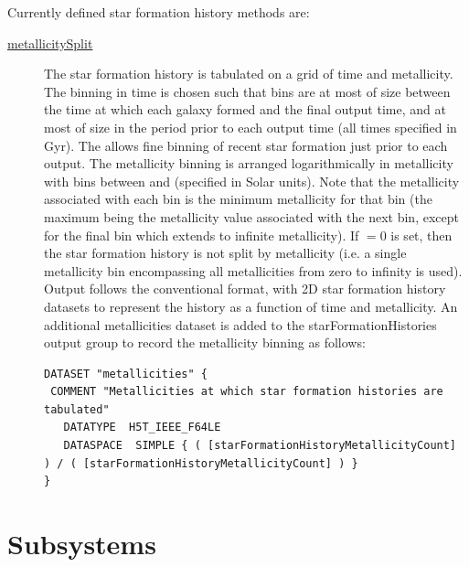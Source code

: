 Currently defined star formation history methods are:
\begin{description}
 \item [\hyperlink{galacticus.output.merger_tree.star_formation.metallicity_split.F90:star_formation_histories_metallicity_split}{{\normalfont \ttfamily metallicitySplit}}] The star formation history is tabulated on a grid of time and metallicity. The binning in time is chosen such that bins are at most of size {\normalfont \ttfamily [starFormationHistoryTimeStep]} between the time at which each galaxy formed and the final output time, and at most of size {\normalfont \ttfamily [starFormationHistoryFineTimeStep]} in the period {\normalfont \ttfamily [starFormationHistoryFineTime]} prior to each output time (all times specified in Gyr). The allows fine binning of recent star formation just prior to each output. The metallicity binning is arranged logarithmically in metallicity with {\normalfont \ttfamily [starFormationHistoryMetallicityCount]} bins between {\normalfont \ttfamily [starFormationHistoryMetallicityMinimum]} and {\normalfont \ttfamily [starFormationHistoryMetallicityMaximum]} (specified in Solar units). Note that the metallicity associated with each bin is the minimum metallicity for that bin (the maximum being the 
metallicity value associated with the next bin, except for the final bin which extends to infinite metallicity). If {\normalfont \ttfamily [starFormationHistoryMetallicityCount]}$=0$ is set, then the star formation history is not split by metallicity (i.e. a single metallicity bin encompassing all metallicities from zero to infinity is used).  Output follows the conventional format, with 2D star formation history datasets to represent the history as a function of time and metallicity. An additional {\normalfont \ttfamily metallicities} dataset is added to the {\normalfont \ttfamily starFormationHistories} output group to record the metallicity binning as follows:
\begin{verbatim}
DATASET "metallicities" {
 COMMENT "Metallicities at which star formation histories are tabulated"
   DATATYPE  H5T_IEEE_F64LE
   DATASPACE  SIMPLE { ( [starFormationHistoryMetallicityCount] ) / ( [starFormationHistoryMetallicityCount] ) }
}
\end{verbatim}
\end{description}

\section{Subsystems}

